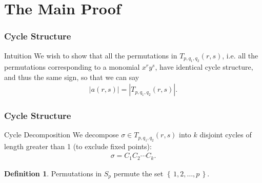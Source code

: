 \documentclass{beamer}
\theoremstyle{plain}
\theoremstyle{definition}
\newtheorem{Def}[theorem]{Definition}
\theoremstyle{remark}
\newcommand{\bee}{\begin{equation}\begin{aligned}}
\newcommand{\eee}{\end{aligned}\end{equation}}
\renewcommand{\'}{\hspace{0.5mm}'}		%
\renewcommand{\Set}[1]{\left\{\,#1\,\right\}}	%
\begin{document}

\section{The Main Proof}


\begin{frame}
\frametitle{Cycle Structure}

\begin{block}{Intuition}
We wish to show that all the permutations in 
$T_{p,q_1,q_2}(r,s)$, i.e. all the permutations
corresponding to a monomial $x^ry^s$, have identical
cycle structure, and thus the same sign, so that
we can say
\bee
	|a(r,s)| = |T_{p,q_1,q_2}(r,s)|. 
\eee
\end{block}

\end{frame}


\begin{frame}
\frametitle{Cycle Structure}

\begin{block}{Cycle Decomposition}
	We decompose $\sigma \in T_{p,q_1,q_2}(r,s)$
	into $k$ disjoint cycles of length greater than 1
	(to exclude fixed points):
	\bee
		\sigma = C_1C_2\cdots C_k. 
	\eee
\end{block}

\begin{Def}
	Permutations in $S_p$ permute the set 
	$\Set{1,2,\hdots, p}$. 
\end{Def}

\end{frame}

\end{document}
